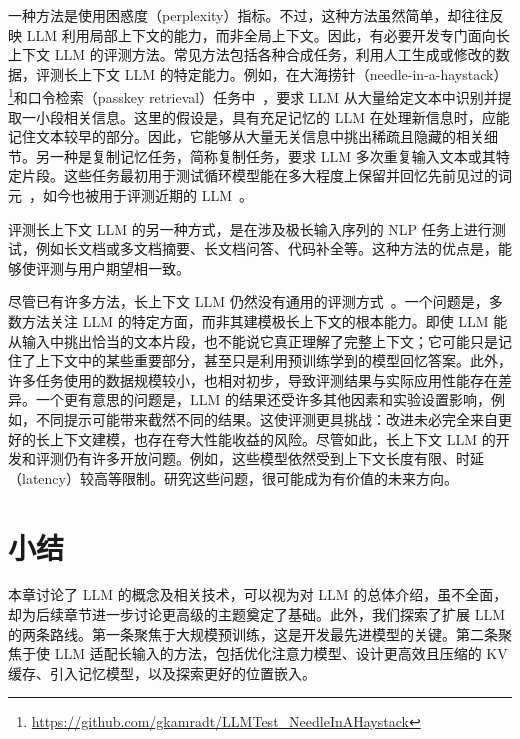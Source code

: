 一种方法是使用困惑度（perplexity）指标。不过，这种方法虽然简单，却往往反映 LLM 利用局部上下文的能力，而非全局上下文。因此，有必要开发专门面向长上下文 LLM 的评测方法。常见方法包括各种合成任务，利用人工生成或修改的数据，评测长上下文 LLM 的特定能力。例如，在大海捞针（needle-in-a-haystack）\footnote{\url{https://github.com/gkamradt/LLMTest_NeedleInAHaystack}}和口令检索（passkey retrieval）任务中~\cite{mohtashami-and-jaggi:2024random,chen-etal:2023extending}，要求 LLM 从大量给定文本中识别并提取一小段相关信息。这里的假设是，具有充足记忆的 LLM 在处理新信息时，应能记住文本较早的部分。因此，它能够从大量无关信息中挑出稀疏且隐藏的相关细节。另一种是复制记忆任务，简称复制任务，要求 LLM 多次重复输入文本或其特定片段。这些任务最初用于测试循环模型能在多大程度上保留并回忆先前见过的词元~\cite{hochreiter-schmidhuber:1997long,arjovsky-etal:2016unitary}，如今也被用于评测近期的 LLM~\cite{bulatov-etal:2022recurrent,gu-and-dao:2023mamba}。

评测长上下文 LLM 的另一种方式，是在涉及极长输入序列的 NLP 任务上进行测试，例如长文档或多文档摘要、长文档问答、代码补全等。这种方法的优点是，能够使评测与用户期望相一致。

尽管已有许多方法，长上下文 LLM 仍然没有通用的评测方式~\cite{liu-etal:2024forgetting}。一个问题是，多数方法关注 LLM 的特定方面，而非其建模极长上下文的根本能力。即使 LLM 能从输入中挑出恰当的文本片段，也不能说它真正理解了完整上下文；它可能只是记住了上下文中的某些重要部分，甚至只是利用预训练学到的模型回忆答案。此外，许多任务使用的数据规模较小，也相对初步，导致评测结果与实际应用性能存在差异。一个更有意思的问题是，LLM 的结果还受许多其他因素和实验设置影响，例如，不同提示可能带来截然不同的结果。这使评测更具挑战：改进未必完全来自更好的长上下文建模，也存在夸大性能收益的风险。尽管如此，长上下文 LLM 的开发和评测仍有许多开放问题。例如，这些模型依然受到上下文长度有限、时延（latency）较高等限制。研究这些问题，很可能成为有价值的未来方向。


\section{小结}

本章讨论了 LLM 的概念及相关技术，可以视为对 LLM 的总体介绍，虽不全面，却为后续章节进一步讨论更高级的主题奠定了基础。此外，我们探索了扩展 LLM 的两条路线。第一条聚焦于大规模预训练，这是开发最先进模型的关键。第二条聚焦于使 LLM 适配长输入的方法，包括优化注意力模型、设计更高效且压缩的 KV 缓存、引入记忆模型，以及探索更好的位置嵌入。

